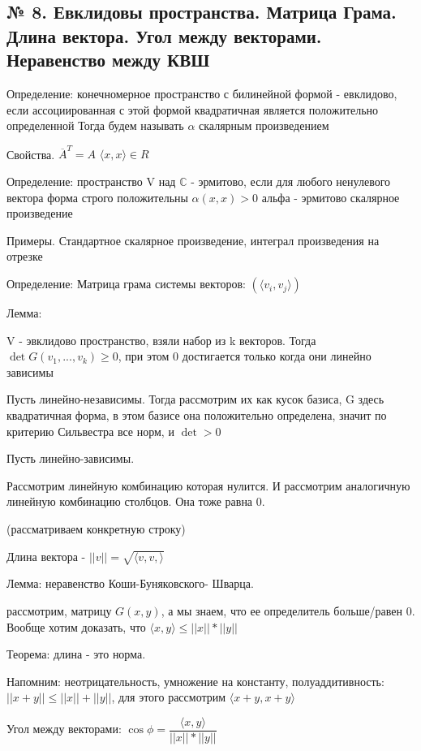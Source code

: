 \documentclass{article}
\begin{document}
\subsection{\tiny № 8. Евклидовы пространства. Матрица Грама. Длина вектора. Угол между векторами. Неравенство между КВШ}

Определение: конечномерное пространство с билинейной формой - евклидово, если ассоциированная с этой формой квадратичная является положительно определенной
Тогда будем называть $\alpha$ скалярным произведением

Свойства. $\overline{A}^T = A$
$\langle x, x \rangle \in R$

Определение: пространство V над $\mathbb{C}$ - эрмитово, если для любого ненулевого вектора форма строго положительны $\alpha(x, x) > 0$
альфа - эрмитово скалярное произведение

Примеры. Стандартное скалярное произведение, интеграл произведения на отрезке

Определение: Матрица грама системы векторов: $(\langle v_i, v_j \rangle)$

Лемма:

V - эвклидово пространство, взяли набор из k векторов. Тогда $\det G(v_1, ... , v_k) \geq 0$, при этом 0 достигается только когда они линейно зависимы

Пусть линейно-независимы. Тогда рассмотрим их как кусок базиса, G здесь квадратичная форма, в этом базисе она положительно определена, значит по критерию Сильвестра все норм, и $\det > 0$

Пусть линейно-зависимы. 

Рассмотрим линейную комбинацию которая нулится. И рассмотрим аналогичную линейную комбинацию столбцов. Она тоже равна 0.

(рассматриваем конкретную строку)

Длина вектора - $||v|| = \sqrt{\langle v, v, \rangle}$

Лемма: неравенство Коши-Буняковского- Шварца.

рассмотрим, матрицу $G(x, y)$, а мы знаем, что ее определитель больше/равен 0. Вообще хотим доказать, что $\langle x, y \rangle \leq ||x|| * ||y||$


Теорема: длина - это норма.

Напомним: неотрицательность, умножение на константу, полуаддитивность: $||x + y|| \leq ||x|| + ||y||$, для этого рассмотрим $\langle x + y, x + y \rangle$

Угол между векторами: $\cos \phi = \dfrac{\langle x, y \rangle}{||x|| * ||y||}$
\end{document}

